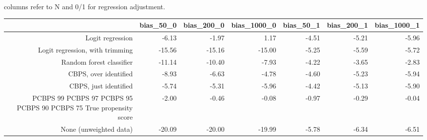 columns refer to N and 0/1 for regression adjustment.
\begin{center}
\begin{tabular}{rrrrrrr}
\hline  & bias_50_0 & bias_200_0 & bias_1000_0 & bias_50_1 & bias_200_1 & bias_1000_1\\
\hline Logit regression & -6.13 & -1.97 & 1.17 & -4.51 & -5.21 & -5.96\\
Logit regression, with trimming & -15.56 & -15.16 & -15.00 & -5.25 & -5.59 & -5.72\\
Random forest classifier & -11.14 & -10.40 & -7.93 & -4.22 & -3.65 & -2.83\\
CBPS, over identified & -8.93 & -6.63 & -4.78 & -4.60 & -5.23 & -5.94\\
CBPS, just identified & -5.74 & -5.31 & -5.96 & -4.42 & -5.13 & -5.90\\
PCBPS 99%
PCBPS 97%
PCBPS 95%
PCBPS 90%
PCBPS 75%
True propensity score & -2.00 & -0.46 & -0.08 & -0.97 & -0.29 & -0.04\\
None (unweighted data) & -20.09 & -20.00 & -19.99 & -5.78 & -6.34 & -6.51\\
\hline\end{tabular}\\
\end{center}

